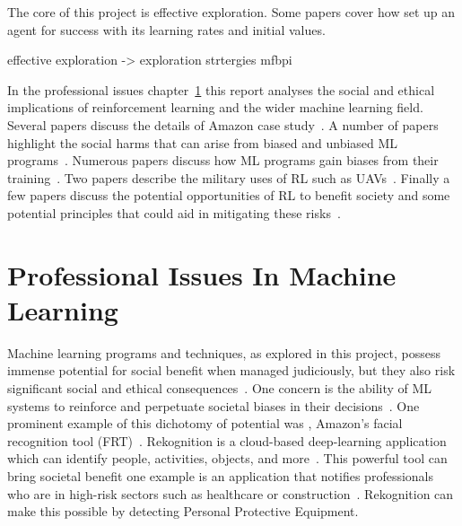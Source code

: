\documentclass[]{final_report}
\begin{document}
The core of this project is effective exploration. Some papers cover how set up an agent for success with its learning rates and initial values\cite{even2003learning, deathTransfer,decayingLearningRates}. 


effective exploration -> 
exploration strtergies
mfbpi




In the professional issues chapter~\ref{chap:professional-issues} this report analyses the social and ethical implications of reinforcement learning and the wider machine learning field. Several papers discuss the details of Amazon  case study~\cite{facialRecognitionBias, legislatingRekognition,legislatingOG, rekognitionOverview}. A number of papers highlight the social harms that can arise from biased and unbiased ML programs~\cite{AISocialImpactAndAccountability,facialRecognitionBias, anprAccountability}. Numerous papers discuss how ML programs gain biases from their training~\cite{LLMSocialEthicalRisks, AISocialImpactAndAccountability, facialRecognitionBias}. Two papers describe the military uses of RL such as UAVs~\cite{rlMilitaryReviewChina, DRLDrones}. Finally a few papers discuss the potential opportunities of RL to benefit society and some potential principles that could aid in mitigating these risks~\cite{AIRisksAndPrinciples,deepRLsocietalImpact, ransbotham2017reshaping}. 


\chapter{Professional Issues In Machine Learning}\label{chap:professional-issues}

Machine learning programs and techniques, as explored in this project, possess immense potential for social benefit when managed judiciously, but they also risk significant social and ethical consequences~\cite{AISocialImpactAndAccountability}. One concern is the ability of ML systems to reinforce and perpetuate societal biases in their decisions~\cite{AISocialImpactAndAccountability}. One prominent example of this dichotomy of potential was , Amazon's facial recognition tool (FRT)~\cite{legislatingOG}. Rekognition is a cloud-based deep-learning application which can identify people, activities, objects, and more~\cite{rekognitionOverview}. This powerful tool can bring societal benefit one example is an application that notifies professionals who are in high-risk sectors such as healthcare or construction~\cite{rekognitionOverview}. Rekognition can make this possible by detecting Personal Protective Equipment. 
\end{document}
